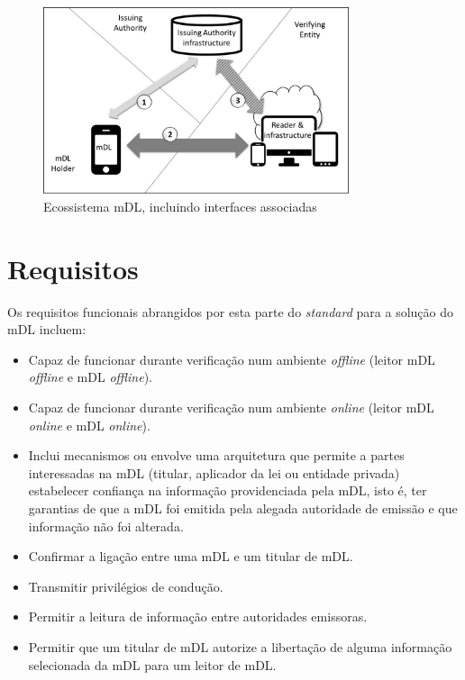 \documentclass[11pt]{article}
\begin{document}
\begin{figure}[H]
	\centering
	\includegraphics[width=0.8\textwidth]{images/interfaces.png}
	\caption{Ecossistema mDL, incluindo interfaces associadas}
	\label{fig:interfaces}
\end{figure}



\section{Requisitos}

Os requisitos funcionais abrangidos por esta parte do \textit{standard} para a solução do mDL incluem:

\begin{itemize}
	\item Capaz de funcionar durante verificação num ambiente \textit{offline} (leitor mDL \textit{offline} e mDL \textit{offline}).
	\item Capaz de funcionar durante verificação num ambiente \textit{online} (leitor mDL \textit{online} e mDL \textit{online}).
	\item Inclui mecanismos ou envolve uma arquitetura que permite a partes interessadas na mDL (titular, aplicador da lei ou entidade privada) estabelecer confiança na informação providenciada pela mDL, isto é, ter garantias de que a mDL foi emitida pela alegada autoridade de emissão e que informação não foi alterada.
	\item Confirmar a ligação entre uma mDL e um titular de mDL.
	\item Transmitir privilégios de condução.
	\item Permitir a leitura de informação entre autoridades emissoras.
	\item Permitir que um titular de mDL autorize a libertação de alguma informação selecionada da mDL para um leitor de mDL.
\end{itemize}
\end{document}
